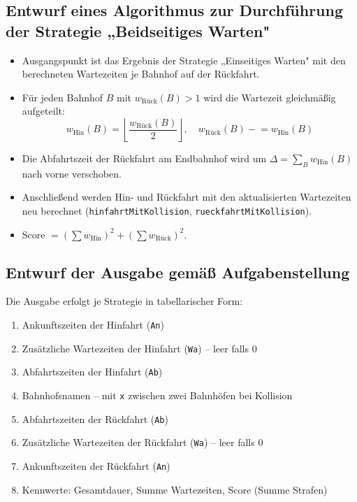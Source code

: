\documentclass[12pt,a4paper]{article}
\begin{document}
\subsection{Entwurf eines Algorithmus zur Durchführung der Strategie „Beidseitiges Warten"}

\begin{itemize}
  \item Ausgangspunkt ist das Ergebnis der Strategie „Einseitiges Warten"
        mit den berechneten Wartezeiten je Bahnhof auf der Rückfahrt.
  \item Für jeden Bahnhof $B$ mit $w_{\text{Rück}}(B) > 1$ wird die Wartezeit
        gleichmäßig aufgeteilt:
        \[
          w_{\text{Hin}}(B) = \left\lfloor \frac{w_{\text{Rück}}(B)}{2} \right\rfloor,
          \quad
          w_{\text{Rück}}(B) \mathrel{-}= w_{\text{Hin}}(B)
        \]
  \item Die Abfahrtszeit der Rückfahrt am Endbahnhof wird um
        $\Delta = \sum_B w_{\text{Hin}}(B)$ nach vorne verschoben.
  \item Anschließend werden Hin- und Rückfahrt mit den aktualisierten
        Wartezeiten neu berechnet (\texttt{hinfahrtMitKollision},
        \texttt{rueckfahrtMitKollision}).
  \item Score $= \left(\sum w_{\text{Hin}}\right)^2 + \left(\sum w_{\text{Rück}}\right)^2$.
\end{itemize}

\subsection{Entwurf der Ausgabe gemäß Aufgabenstellung}

Die Ausgabe erfolgt je Strategie in tabellarischer Form:
\begin{enumerate}
  \item Ankunftszeiten der Hinfahrt (\texttt{An})
  \item Zusätzliche Wartezeiten der Hinfahrt (\texttt{Wa}) -- leer falls 0
  \item Abfahrtszeiten der Hinfahrt (\texttt{Ab})
  \item Bahnhofsnamen -- mit \texttt{x} zwischen zwei Bahnhöfen bei Kollision
  \item Abfahrtszeiten der Rückfahrt (\texttt{Ab})
  \item Zusätzliche Wartezeiten der Rückfahrt (\texttt{Wa}) -- leer falls 0
  \item Ankunftszeiten der Rückfahrt (\texttt{An})
  \item Kennwerte: Gesamtdauer, Summe Wartezeiten, Score (Summe Strafen)
\end{enumerate}
\end{document}
